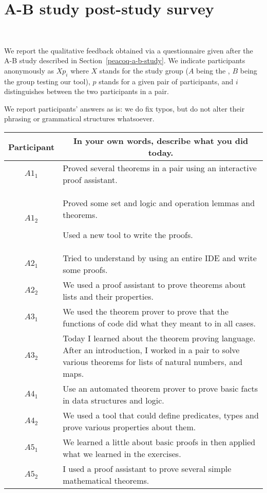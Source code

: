 \chapter{\PeaCoq{} A-B study post-study survey}~\label{appendix-peacoq-a-b-study}

We report the qualitative feedback obtained via a questionnaire given after the
A-B study described in Section~\ref{peacoq-a-b-study}.  We indicate participants
anonymously as $Xp_{i}$ where $X$ stands for the study group ($A$ being the
, $B$ being the group testing our tool), $p$ stands for a
given pair of participants, and $i$ distinguishes between the two participants
in a pair.

We report participants' answers as is: we do fix typos, but do not alter their
phrasing or grammatical structures whatsoever.

\clearpage

\noindent
\begin{tabularx}{\linewidth}{@{}cX@{}}
  \toprule
  Participant & \multicolumn{1}{c}{
    \textbf{In your own words, describe what you did today.}
  } \\ \midrule
  $A1_{1}$ & Proved several theorems in a pair using an interactive proof assistant. \\
  $A1_{2}$ & \begin{enumerate*} \item Proved some set and logic and operation lemmas and theorems. \item Used a new tool to write the proofs. \end{enumerate*} \\
  $A2_{1}$ & Tried to understand \Coq{} by using an entire IDE and write some proofs. \\
  $A2_{2}$ & We used a proof assistant to prove theorems about lists and their properties. \\
  $A3_{1}$ & We used the theorem prover to prove that the functions of code did what they meant to in all cases. \\
  $A3_{2}$ & Today I learned about the \Coq{} theorem proving language.  After an introduction, I worked in a pair to solve various theorems for lists of natural numbers, and maps. \\
  $A4_{1}$ & Use an automated theorem prover to prove basic facts in data structures and logic. \\
  $A4_{2}$ & We used a tool that could define predicates, types and prove various properties about them. \\
  $A5_{1}$ & We learned a little about basic proofs in \Coq{} then applied what we learned in the exercises. \\
  $A5_{2}$ & I used a proof assistant to prove several simple mathematical theorems. \\
\end{tabularx}{\parfillskip=0pt\par}

